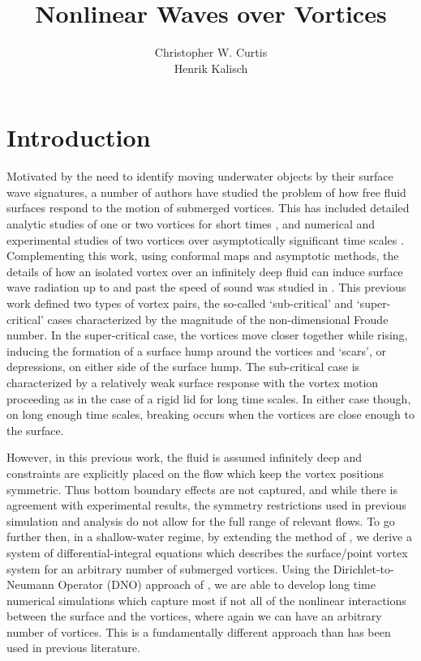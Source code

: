 \documentclass[a4paper,11pt]{article}
\title{Nonlinear Waves over Vortices}
\author{Christopher W. Curtis\\ Henrik Kalisch}
\date{}
\begin{document}
\maketitle
\section{Introduction}
Motivated by the need to identify moving underwater objects by their surface wave signatures, a number of authors have studied the problem of how free fluid surfaces respond to the motion of submerged vortices.  This has included detailed analytic studies of one or two vortices for short times \cite{tyvand1,tyvand2}, and numerical and experimental studies of two vortices over asymptotically significant time scales \cite{fish,marcus,telste,tryggvason}.  Complementing this work, using conformal maps and asymptotic methods, the details of how an isolated vortex over an infinitely deep fluid can induce surface wave radiation up to and past the speed of sound was studied in \cite{ruban}.  This previous work defined two types of vortex pairs, the so-called `sub-critical' and `super-critical' cases characterized by the magnitude of the non-dimensional Froude number.  In the super-critical case, the vortices move closer together while rising, inducing the formation of a surface hump around the vortices and `scars', or depressions, on either side of the surface hump.  The sub-critical case is characterized by a relatively weak surface response with the vortex motion proceeding as in the case of a rigid lid for long time scales.  In either case though, on long enough time scales, breaking occurs when the vortices are close enough to the surface.  

However, in this previous work, the fluid is assumed infinitely deep and constraints are explicitly placed on the flow which keep the vortex positions symmetric.  Thus bottom boundary effects are not captured, and while there is agreement with experimental results, the symmetry restrictions used in previous simulation and analysis do not allow for the full range of relevant flows.  To go further then, in a shallow-water regime, by extending the method of \cite{afm}, we derive a system of differential-integral equations which describes the surface/point vortex system for an arbitrary number of submerged vortices.  Using the Dirichlet-to-Neumann Operator (DNO) approach of \cite{craig,guyenne}, we are able to develop long time numerical simulations which capture most if not all of the nonlinear interactions between the surface and the vortices, where again we can have an arbitrary number of vortices.  This is a fundamentally  different approach than has been used in previous literature.  
\end{document}
